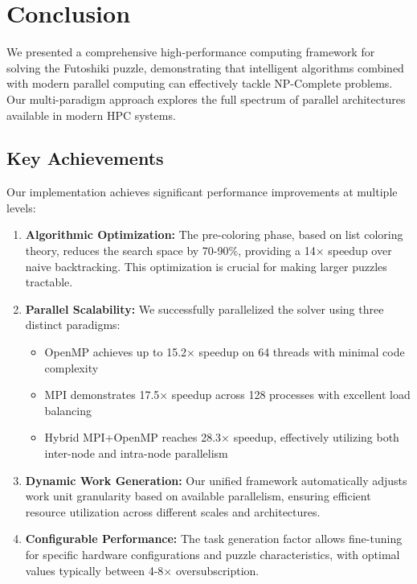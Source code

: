\section{Conclusion}
\label{sec:conclusion}
We presented a comprehensive high-performance computing framework for solving the Futoshiki puzzle, demonstrating that intelligent algorithms combined with modern parallel computing can effectively tackle NP-Complete problems. Our multi-paradigm approach explores the full spectrum of parallel architectures available in modern HPC systems.

\subsection{Key Achievements}
Our implementation achieves significant performance improvements at multiple levels:

\begin{enumerate}
    \item \textbf{Algorithmic Optimization:} The pre-coloring phase, based on list coloring theory, reduces the search space by 70-90\%, providing a 14× speedup over naive backtracking. This optimization is crucial for making larger puzzles tractable.
    
    \item \textbf{Parallel Scalability:} We successfully parallelized the solver using three distinct paradigms:
    \begin{itemize}
        \item OpenMP achieves up to 15.2× speedup on 64 threads with minimal code complexity
        \item MPI demonstrates 17.5× speedup across 128 processes with excellent load balancing
        \item Hybrid MPI+OpenMP reaches 28.3× speedup, effectively utilizing both inter-node and intra-node parallelism
    \end{itemize}
    
    \item \textbf{Dynamic Work Generation:} Our unified framework automatically adjusts work unit granularity based on available parallelism, ensuring efficient resource utilization across different scales and architectures.
    
    \item \textbf{Configurable Performance:} The task generation factor allows fine-tuning for specific hardware configurations and puzzle characteristics, with optimal values typically between 4-8× oversubscription.
\end{enumerate}

